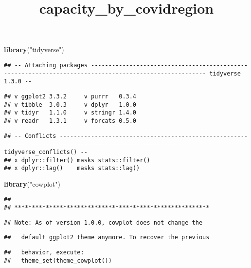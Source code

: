 \documentclass[
]{article}
\title{capacity\_by\_covidregion}
\author{}
\date{\vspace{-2.5em}}
\newenvironment{Shaded}{\begin{snugshade}}{\end{snugshade}}
\newcommand{\KeywordTok}[1]{\textcolor[rgb]{0.13,0.29,0.53}{\textbf{#1}}}
\newcommand{\NormalTok}[1]{#1}
\newcommand{\StringTok}[1]{\textcolor[rgb]{0.31,0.60,0.02}{#1}}
\begin{document}
\maketitle

\begin{Shaded}
\begin{Highlighting}[]
\KeywordTok{library}\NormalTok{(}\StringTok{"tidyverse"}\NormalTok{)}
\end{Highlighting}
\end{Shaded}

\begin{verbatim}
## -- Attaching packages ------------------------------------------------------------------------------------------------------- tidyverse 1.3.0 --
\end{verbatim}

\begin{verbatim}
## v ggplot2 3.3.2     v purrr   0.3.4
## v tibble  3.0.3     v dplyr   1.0.0
## v tidyr   1.1.0     v stringr 1.4.0
## v readr   1.3.1     v forcats 0.5.0
\end{verbatim}

\begin{verbatim}
## -- Conflicts ---------------------------------------------------------------------------------------------------------- tidyverse_conflicts() --
## x dplyr::filter() masks stats::filter()
## x dplyr::lag()    masks stats::lag()
\end{verbatim}

\begin{Shaded}
\begin{Highlighting}[]
\KeywordTok{library}\NormalTok{(}\StringTok{"cowplot"}\NormalTok{)}
\end{Highlighting}
\end{Shaded}

\begin{verbatim}
## 
## ********************************************************
\end{verbatim}

\begin{verbatim}
## Note: As of version 1.0.0, cowplot does not change the
\end{verbatim}

\begin{verbatim}
##   default ggplot2 theme anymore. To recover the previous
\end{verbatim}

\begin{verbatim}
##   behavior, execute:
##   theme_set(theme_cowplot())
\end{verbatim}
\end{document}
